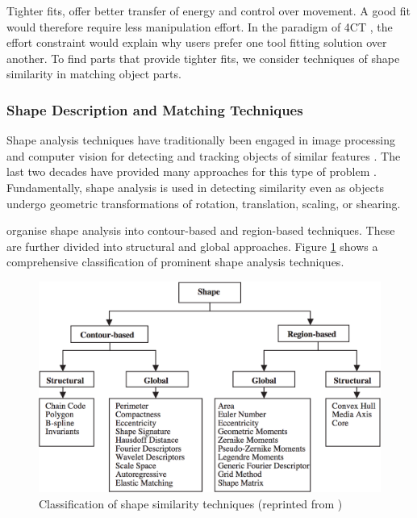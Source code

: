 \documentclass[
    floatsintext
]{article}
\begin{document}
Tighter fits, offer better transfer of energy and control over movement.
A good fit would therefore require less manipulation effort.
In the paradigm of 4CT \cite{osiurak2014}, the effort constraint would explain why users prefer one tool fitting solution over another. 
To find parts that provide tighter fits, we consider techniques of shape similarity in matching object parts.

\subsubsection{Shape Description and Matching Techniques}
Shape analysis techniques have traditionally been engaged in image processing and computer vision for detecting and tracking objects of similar features \cite{loncaric1998,zhang2004,robert2012}.
The last two decades have provided many approaches for this type of problem \cite{loncaric1998,zhang2004,veltkamp2001,robert2012}.
Fundamentally, shape analysis is used in detecting similarity even as objects undergo geometric transformations of rotation, translation, scaling, or shearing.     

\cite{zhang2004} organise shape analysis into contour-based and region-based techniques.
These are further divided into structural and global approaches.
Figure \ref{fig:shape_similarity} shows a comprehensive classification of prominent shape analysis techniques. 

\begin{figure}[h]
  \centering
  \includegraphics[width=1\textwidth]{./figures/similarity_techniques.png}
  \caption{Classification of shape similarity techniques (reprinted from \cite{zhang2004})}
  \label{fig:shape_similarity}
\end{figure}  
\end{document}
